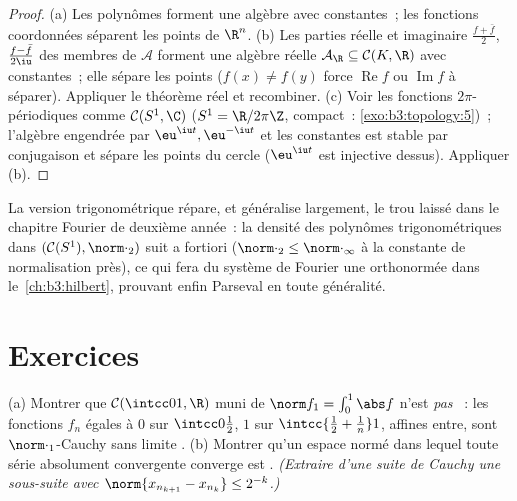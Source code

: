 \begin{proof}
(a) Les polynômes forment une algèbre avec constantes~; les
fonctions coordonnées séparent les points de $\R^n$.
(b) Les parties réelle et imaginaire $\frac{f + \bar f}2$,
$\frac{f - \bar f}{2\iu}$ des membres de $\mathcal A$ forment
une algèbre réelle $\mathcal A_\R \subseteq \mathcal C(K, \R)$
avec constantes~; elle sépare les points ($f(x) \ne f(y)$ force
$\operatorname{Re}f$ ou $\operatorname{Im}f$ à séparer).
Appliquer le théorème réel et recombiner.
(c) Voir les fonctions $2\pi$-périodiques comme $\mathcal
C(S^1, \C)$ ($S^1 = \R/2\pi\Z$, compact~:
\cref{exo:b3:topology:5})~; l'algèbre engendrée par
$\eu^{\iu t}, \eu^{-\iu t}$ et les constantes est stable par
conjugaison et sépare les points du cercle ($\eu^{\iu t}$ est
injective dessus). Appliquer (b).
\end{proof}

\begin{remark}\label{rem:b3:complete:swremark}
La version trigonométrique répare, et généralise largement, le
trou laissé dans le chapitre Fourier de deuxième année~: la
densité des polynômes trigonométriques dans $(\mathcal
C(S^1), \norm\cdot_2)$ suit a fortiori ($\norm\cdot_2 \leq
\norm\cdot_\infty$ à la constante de normalisation près), ce
qui fera du système de Fourier une \emph{} orthonormée
dans le~\cref{ch:b3:hilbert}, prouvant enfin Parseval en toute
généralité.
\end{remark}

\section{Exercices}

\begin{exercise}[$\star$]\label{exo:b3:complete:1}
(a) Montrer que $\mathcal C(\intcc01, \R)$ muni de
$\norm f_1 = \int_0^1\abs f$ n'est \emph{pas} ~: les
fonctions $f_n$ égales à $0$ sur $\intcc0{\frac12}$, $1$ sur
$\intcc{\frac12 + \frac1n}1$, affines entre, sont
$\norm\cdot_1$-Cauchy sans limite .
(b) Montrer qu'un espace normé dans lequel toute série
absolument convergente converge est . \emph{(Extraire
d'une suite de Cauchy une sous-suite avec $\norm{x_{n_{k+1}} -
x_{n_k}} \leq 2^{-k}$.)}
\end{exercise}

